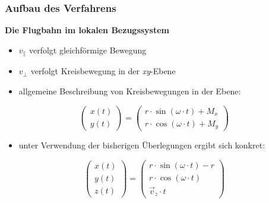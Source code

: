 \begin{frame}
  \frametitle{Aufbau des Verfahrens}
  \onslide<+->
  \textbf{Die Flugbahn im lokalen Bezugssystem}
  \begin{itemize}
    \item<+-> \(v_\parallel\) verfolgt gleichf\"ormige Bewegung
    \item<+-> \(v_\perp\) verfolgt Kreisbewegung in der \textit{xy}-Ebene
    \item<+-> allgemeine Beschreibung von Kreisbewegungen in der Ebene:
  \end{itemize}
  \onslide<+->
  \begin{equation*}
    \begin{pmatrix}
      x(t) \\
      y(t)
    \end{pmatrix}
    =
    \begin{pmatrix}
      r \cdot \sin{\left(\omega \cdot t\right)} + M_x \\
      r \cdot \cos{\left(\omega \cdot t\right)} + M_y
    \end{pmatrix}
  \end{equation*}
  \begin{itemize}
  \item<+-> unter Verwendung der bisherigen \"Uberlegungen ergibt sich konkret:
  \end{itemize}
  \onslide<+->
  \begin{equation*}
    \begin{pmatrix}
      x(t) \\
      y(t) \\
      z(t)
    \end{pmatrix}
    =
    \begin{pmatrix}
      r \cdot \sin{\left(\omega \cdot t\right)} - r \\
      r \cdot \cos{\left(\omega \cdot t\right)} \\
      \vec{v}_z \cdot t
    \end{pmatrix}
  \end{equation*}
\end{frame}

